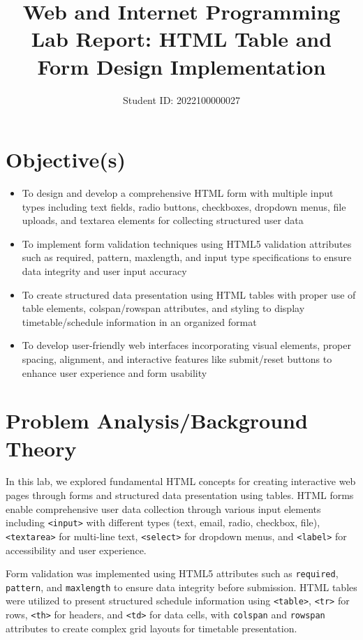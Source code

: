 \documentclass[twoside]{article}
\date{}
\author{Student ID: 2022100000027}
\begin{document}
\title{Web and Internet Programming Lab Report: HTML Table and Form Design Implementation}
\maketitle


\section{Objective(s)}
\begin{itemize}
    \item To design and develop a comprehensive HTML form with multiple input types including text fields, radio buttons, checkboxes, dropdown menus, file uploads, and textarea elements for collecting structured user data
    \item To implement form validation techniques using HTML5 validation attributes such as required, pattern, maxlength, and input type specifications to ensure data integrity and user input accuracy
    \item To create structured data presentation using HTML tables with proper use of table elements, colspan/rowspan attributes, and styling to display timetable/schedule information in an organized format
    \item To develop user-friendly web interfaces incorporating visual elements, proper spacing, alignment, and interactive features like submit/reset buttons to enhance user experience and form usability
\end{itemize}


\section{Problem Analysis/Background Theory}
In this lab, we explored fundamental HTML concepts for creating interactive web pages through forms and structured data presentation using tables. HTML forms enable comprehensive user data collection through various input elements including \texttt{<input>} with different types (text, email, radio, checkbox, file), \texttt{<textarea>} for multi-line text, \texttt{<select>} for dropdown menus, and \texttt{<label>} for accessibility and user experience. 

Form validation was implemented using HTML5 attributes such as \texttt{required}, \texttt{pattern}, and \texttt{maxlength} to ensure data integrity before submission. HTML tables were utilized to present structured schedule information using \texttt{<table>}, \texttt{<tr>} for rows, \texttt{<th>} for headers, and \texttt{<td>} for data cells, with \texttt{colspan} and \texttt{rowspan} attributes to create complex grid layouts for timetable presentation. 
\end{document}
